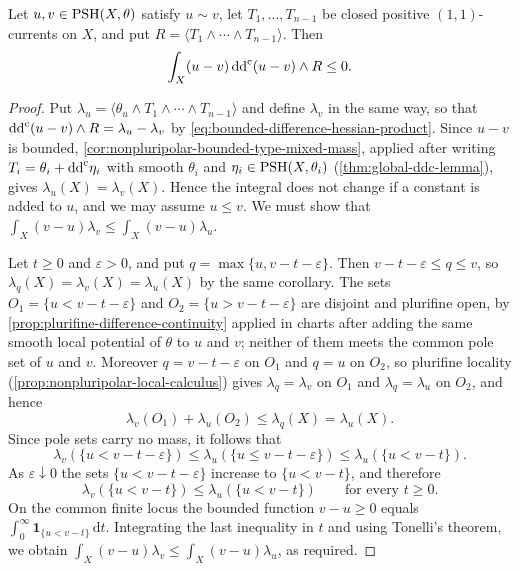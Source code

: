 \begin{lemma}\label{lem:bounded-difference-negative-hessian-energy}
Let $u,v\in\mathrm{PSH}(X,\theta)$ satisfy $u\sim v$, let $T_1,\ldots,T_{n-1}$ be closed positive $(1,1)$-currents on $X$, and put $R=\langle T_1\wedge\cdots\wedge T_{n-1}\rangle$. Then
\[
 \int_X(u-v)\,\mathrm{dd}^{\mathrm{c}}(u-v)\wedge R\leq0.
\]
\end{lemma}
\begin{proof}
Put $\lambda_u=\langle\theta_u\wedge T_1\wedge\cdots\wedge T_{n-1}\rangle$ and define $\lambda_v$ in the same way, so that $\mathrm{dd}^{\mathrm{c}}(u-v)\wedge R=\lambda_u-\lambda_v$ by \eqref{eq:bounded-difference-hessian-product}. Since $u-v$ is bounded, \cref{cor:nonpluripolar-bounded-type-mixed-mass}, applied after writing $T_i=\theta_i+\mathrm{dd}^{\mathrm{c}}\eta_i$ with smooth $\theta_i$ and $\eta_i\in\mathrm{PSH}(X,\theta_i)$ (\cref{thm:global-ddc-lemma}), gives $\lambda_u(X)=\lambda_v(X)$. Hence the integral does not change if a constant is added to $u$, and we may assume $u\leq v$. We must show that $\int_X(v-u)\lambda_v\leq\int_X(v-u)\lambda_u$.

Let $t\geq0$ and $\varepsilon>0$, and put $q=\max\{u,v-t-\varepsilon\}$. Then $v-t-\varepsilon\leq q\leq v$, so $\lambda_q(X)=\lambda_v(X)=\lambda_u(X)$ by the same corollary. The sets $O_1=\{u<v-t-\varepsilon\}$ and $O_2=\{u>v-t-\varepsilon\}$ are disjoint and plurifine open, by \cref{prop:plurifine-difference-continuity} applied in charts after adding the same smooth local potential of $\theta$ to $u$ and $v$; neither of them meets the common pole set of $u$ and $v$. Moreover $q=v-t-\varepsilon$ on $O_1$ and $q=u$ on $O_2$, so plurifine locality (\cref{prop:nonpluripolar-local-calculus}) gives $\lambda_q=\lambda_v$ on $O_1$ and $\lambda_q=\lambda_u$ on $O_2$, and hence
\[
 \lambda_v(O_1)+\lambda_u(O_2)\leq\lambda_q(X)=\lambda_u(X).
\]
Since pole sets carry no mass, it follows that
\[
 \lambda_v(\{u<v-t-\varepsilon\})
    \leq\lambda_u(\{u\leq v-t-\varepsilon\})
    \leq\lambda_u(\{u<v-t\}).
\]
As $\varepsilon\downarrow0$ the sets $\{u<v-t-\varepsilon\}$ increase to $\{u<v-t\}$, and therefore
\[
 \lambda_v(\{u<v-t\})\leq\lambda_u(\{u<v-t\})\qquad\text{for every }t\geq0.
\]
On the common finite locus the bounded function $v-u\geq0$ equals $\int_0^\infty\mathbf1_{\{u<v-t\}}\,\mathrm dt$. Integrating the last inequality in $t$ and using Tonelli's theorem, we obtain $\int_X(v-u)\lambda_v\leq\int_X(v-u)\lambda_u$, as required.
\end{proof}

